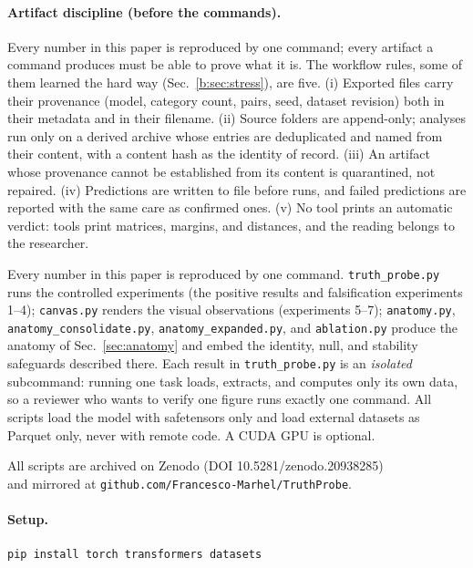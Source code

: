 \documentclass[11pt]{article}
\begin{document}
\paragraph{Artifact discipline (before the commands).} Every number in
this paper is reproduced by one command; every artifact a command produces
must be able to prove what it is. The workflow rules, some of them learned
the hard way (Sec.~\ref{b:sec:stress}), are five. (i) Exported files carry
their provenance (model, category count, pairs, seed, dataset revision)
both in their metadata and in their filename. (ii) Source folders are
append-only; analyses run only on a derived archive whose entries are
deduplicated and named from their content, with a content hash as the
identity of record. (iii) An artifact whose provenance cannot be
established from its content is quarantined, not repaired. (iv)
Predictions are written to file before runs, and failed predictions are
reported with the same care as confirmed ones. (v) No tool prints an
automatic verdict: tools print matrices, margins, and distances, and the
reading belongs to the researcher.

Every number in this paper is reproduced by one command. \texttt{truth\_probe.py}
runs the controlled experiments (the positive results and falsification
experiments 1--4); \texttt{canvas.py} renders the visual observations
(experiments 5--7); \texttt{anatomy.py}, \texttt{anatomy\_consolidate.py},
\texttt{anatomy\_expanded.py}, and \texttt{ablation.py} produce the anatomy of
Sec.~\ref{sec:anatomy} and embed the identity, null, and stability safeguards
described there. Each result in \texttt{truth\_probe.py} is an \emph{isolated}
subcommand: running one task loads, extracts, and computes only its own data,
so a reviewer who wants to verify one figure runs exactly one command. All
scripts load the model with safetensors only and load external datasets as
Parquet only, never with remote code. A CUDA GPU is optional.

All scripts are archived on Zenodo (DOI 10.5281/zenodo.20938285) \\ and  mirrored
at \texttt{github.com/Francesco-Marhel/TruthProbe}.

\paragraph{Setup.}
\begin{verbatim}
pip install torch transformers datasets
\end{verbatim}
\end{document}
